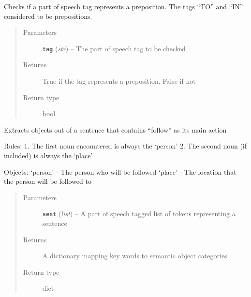 \documentclass[letterpaper,10pt,english]{sphinxmanual}
\begin{document}

\begin{fulllineitems}
\label{extractor:interpreter.extractor.is_preposition}
Checks if a part of speech tag represents a preposition. The tags ``TO'' and ``IN'' considered to be prepositions.
\begin{quote}\begin{description}
\item[{Parameters}] \leavevmode
\textbf{\texttt{tag}} (\emph{str}) -- The part of speech tag to be checked

\item[{Returns}] \leavevmode
True if the tag represents a preposition, False if not

\item[{Return type}] \leavevmode
bool

\end{description}\end{quote}

\end{fulllineitems}


\begin{fulllineitems}
\label{extractor:interpreter.extractor.object_dict_follow}
Extracts objects out of a sentence that contains ``follow'' as its main action

Rules:
1. The first noun encountered is always the `person'
2. The second noun (if included) is always the `place'

Objects:
`person' - The person who will be followed
`place' - The location that the person will be followed to
\begin{quote}\begin{description}
\item[{Parameters}] \leavevmode
\textbf{\texttt{sent}} (\emph{list}) -- A part of speech tagged list of tokens representing a sentence

\item[{Returns}] \leavevmode
A dictionary mapping key words to semantic object categories

\item[{Return type}] \leavevmode
dict

\end{description}\end{quote}

\end{fulllineitems}
\end{document}
